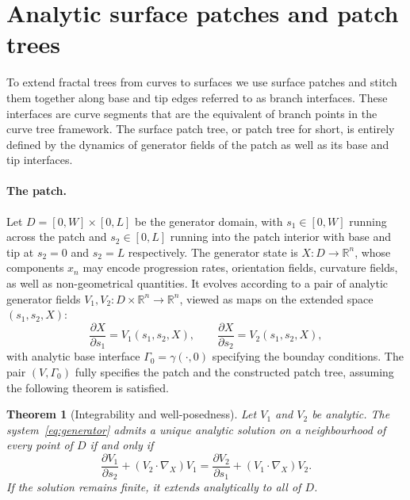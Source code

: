 \documentclass[11pt,a4paper]{article}
\newtheorem{theorem}{Theorem}[section]
\begin{document}
\section{Analytic surface patches and patch trees}
\label{sec:framework}

To extend fractal trees from curves to surfaces we use surface patches
and stitch them together along base and tip edges referred to as branch interfaces.
These interfaces are curve segments that are the equivalent of branch points 
in the curve tree framework. The surface patch tree, or patch tree for short, 
is entirely defined by the dynamics of generator fields of the patch as well 
as its base and tip interfaces.

\paragraph{The patch.}
Let $D = [0,W]\times[0,L]$ be the generator domain, with $s_1 \in [0,W]$
running across the patch and $s_2 \in [0,L]$ running into the patch interior
with base and tip at $s_2=0$ and $s_2=L$ respectively.
The generator state is $X: D \to \mathbb{R}^n$, whose components $x_n$ may
encode progression rates, orientation fields, curvature fields, as well as 
non-geometrical quantities. It evolves according to a pair of analytic
generator fields $V_1, V_2 : D \times \mathbb{R}^n \to \mathbb{R}^n$,
viewed as maps on the extended space $(s_1,s_2,X)$:
\begin{equation}
    \frac{\partial X}{\partial s_1} = V_1(s_1,s_2,X), \qquad
    \frac{\partial X}{\partial s_2} = V_2(s_1,s_2,X),
    \label{eq:generator}
\end{equation}
with analytic base interface $\Gamma_0 = \gamma(\cdot,0)$ specifying the bounday conditions. 
The pair $(V, \Gamma_0)$ fully specifies the patch and the constructed patch tree, assuming 
the following theorem is satisfied.

\begin{theorem}[Integrability and well-posedness]
\label{thm:integrability}
Let $V_1$ and $V_2$ be analytic. The system~\eqref{eq:generator}
admits a unique analytic solution on a neighbourhood of every point
of $D$ if and only if
\begin{equation}
    \frac{\partial V_1}{\partial s_2}
    + (V_2 \cdot \nabla_X)V_1
    =
    \frac{\partial V_2}{\partial s_1}
    + (V_1 \cdot \nabla_X)V_2.
    \label{eq:integrability}
\end{equation}
If the solution remains finite, it extends analytically to all of
$D$.
\end{theorem}
\end{document}
